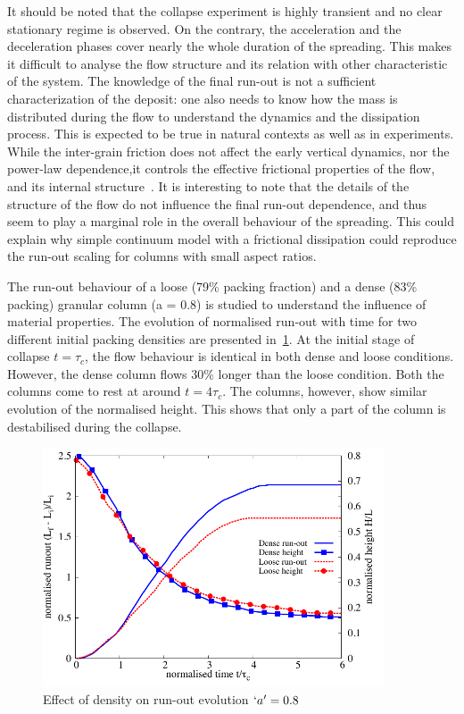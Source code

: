 It should be noted that the collapse experiment is highly transient and no 
clear stationary regime is observed. On the contrary, the acceleration and the 
deceleration phases cover nearly the whole duration of the spreading. This 
makes it difficult to analyse the flow structure and its relation with other 
characteristic of the system. The knowledge of the final run-out is not a 
sufficient characterization of the deposit: one also needs to know how the mass 
is distributed during the flow to understand the dynamics and the dissipation 
process. This is expected to be true in natural contexts as well as in 
experiments. While the inter-grain friction does not affect the early vertical 
dynamics, nor the power-law dependence,it controls the effective frictional 
properties of the flow, and its internal structure~\citep{Staron2006a}. It is 
interesting to note that the details of the structure of the flow do not 
influence the final run-out dependence, and thus seem to play a marginal role 
in the overall behaviour of the spreading. This could explain why simple 
continuum model with a frictional dissipation could reproduce the run-out 
scaling for columns with small aspect ratios.

The run-out behaviour of a loose (79\% packing fraction) and a dense (83\% 
packing) granular column (a = 0.8) is studied to understand the influence of 
material properties. The evolution of normalised run-out with time for two 
different initial packing 
densities are presented in~\cref{fig:runout_height_dense_r18}. At the initial 
stage of collapse $t=\tau_c$, the flow behaviour is identical in both dense and 
loose conditions. However, the dense column flows 30\% longer than the loose 
condition. Both the columns come to rest at around $t = 4\tau_c$. The columns, 
however, show similar evolution of the normalised height. This shows that only 
a part of the column is destabilised during the collapse.
\begin{figure}[h]
\centering
\includegraphics[width=0.9\textwidth]{runout_height_dense_r18}
\caption{Effect of density on run-out evolution $`a' = 0.8$}
\label{fig:runout_height_dense_r18}
\end{figure}

